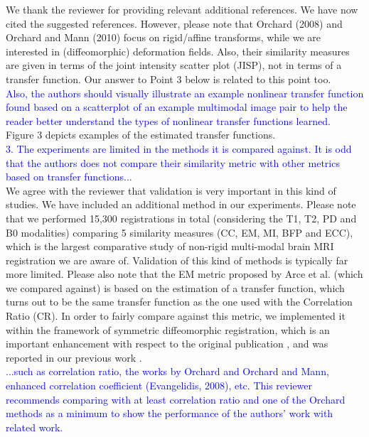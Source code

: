 \documentclass[onecolumn]{IEEEtran}
\begin{document}
We thank the reviewer for providing relevant additional references. We have now cited the suggested references. However, please note that Orchard (2008) and Orchard and Mann (2010) focus on rigid/affine transforms, while we are interested in (diffeomorphic) deformation fields. Also, their similarity measures are given in terms of the joint intensity scatter plot (JISP), not in terms of a transfer function. Our answer to Point 3 below is related to this point too.\\

\textcolor{blue}{Also, the authors should visually illustrate an example nonlinear transfer function found based on a scatterplot of an example multimodal image pair to help the reader better understand the types of nonlinear transfer functions learned.}\\

Figure 3 depicts examples of the estimated transfer functions.\\

\textcolor{blue}{3. The experiments are limited in the methods it is compared against.  
It is odd that the authors does not compare their similarity metric with other metrics based on transfer functions...}\\

We agree with the reviewer that validation is very important in this kind of studies. We have included an additional method in our experiments. Please note that we performed 15,300 registrations in total (considering the T1, T2, PD and B0 modalities) comparing 5 similarity measures (CC, EM, MI, BFP and ECC), which is the largest comparative study of non-rigid multi-modal brain MRI registration we are aware of. Validation of this kind of methods is typically far more limited. Please also note that the EM metric proposed by Arce et al. \cite{Arce-santana2014} (which we compared against) is based on the estimation of a transfer function, which turns out to be the same transfer function as the one used with the Correlation Ratio (CR). In order to fairly compare against this metric, we implemented it within the framework of symmetric diffeomorphic registration, which is an important enhancement with respect to the original publication \cite{Arce-santana2014}, and was reported in our previous work \cite{ocegueda2015}.\\

\textcolor{blue}{...such as correlation ratio, the works by Orchard and Orchard and Mann, enhanced correlation coefficient (Evangelidis, 2008), etc.  This reviewer recommends comparing with at least correlation ratio and one of the Orchard methods as a minimum to show the performance of the authors' work with related work.}\\
\end{document}
